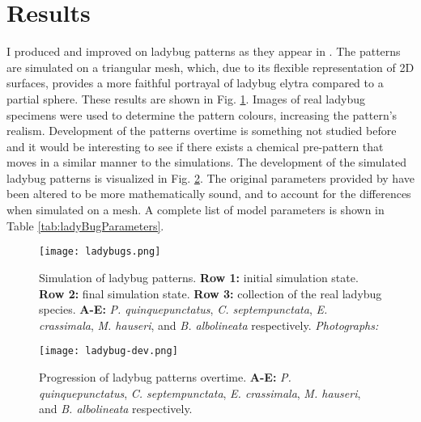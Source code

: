 \section{Results}
I produced and improved on ladybug patterns as they appear in \citep{liaw2001}. The patterns are simulated on a triangular mesh, which, due to its flexible representation of 2D surfaces, provides a more faithful portrayal of ladybug elytra compared to a partial sphere. These results are shown in Fig. \ref{fig:ladyBugPatterns}. Images of real ladybug specimens were used to determine the pattern colours, increasing the pattern's realism. Development of the patterns overtime is something not studied before and it would be interesting to see if there exists a chemical pre-pattern that moves in a similar manner to the simulations. The development of the simulated ladybug patterns is visualized in Fig. \ref{fig:ladyBugDev}. The original parameters provided by \citet{liaw2001} have been altered to be more mathematically sound, and to account for the differences when simulated on a mesh. A complete list of model parameters is shown in Table \ref{tab:ladyBugParameters}. 


\begin{figure}[p]
	\centering
	\texttt{[image: ladybugs.png]}
	\caption{Simulation of ladybug patterns. \textbf{Row 1:} initial simulation state. \textbf{Row 2:} final simulation state. \textbf{Row 3:} collection of the real ladybug species. \textbf{A-E:} \textit{P. quinquepunctatus}, \textit{C. septempunctata}, \textit{E. crassimala}, \textit{M. hauseri}, and \textit{B. albolineata} respectively. 
	 \textit{Photographs: \citep{chen2008}}}
	\label{fig:ladyBugPatterns}
\end{figure}

\begin{figure}[H]
	\centering
	\texttt{[image: ladybug-dev.png]}
	\caption{Progression of ladybug patterns overtime. \textbf{A-E:} \textit{P. quinquepunctatus}, \textit{C. septempunctata}, \textit{E. crassimala}, \textit{M. hauseri}, and \textit{B. albolineata} respectively.}
	\label{fig:ladyBugDev}
\end{figure}

\newcommand{\orig}[1]{\textcolor{gray}{(#1)}}

